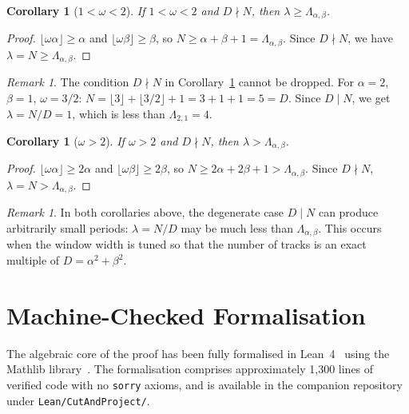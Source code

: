 \documentclass[11pt]{article}
\theoremstyle{plain}
\newtheorem{corollary}[theorem]{Corollary}
\theoremstyle{definition}
\theoremstyle{remark}
\newtheorem{remark}[theorem]{Remark}
\begin{document}
\begin{corollary}[$1 < \omega < 2$]\label{cor:medium_omega}
If $1 < \omega < 2$ and $D \nmid N$, then
$\lambda \ge \Lambda_{\alpha,\beta}$.
\end{corollary}
\begin{proof}
$\lfloor\omega\alpha\rfloor \ge \alpha$ and
$\lfloor\omega\beta\rfloor \ge \beta$, so
$N \ge \alpha + \beta + 1 = \Lambda_{\alpha,\beta}$.
Since $D \nmid N$, we have $\lambda = N \ge \Lambda_{\alpha,\beta}$.
\end{proof}

\begin{remark}
The condition $D \nmid N$ in Corollary~\ref{cor:medium_omega} cannot be
dropped.  For $\alpha = 2$, $\beta = 1$, $\omega = 3/2$:
$N = \lfloor 3 \rfloor + \lfloor 3/2 \rfloor + 1 = 3 + 1 + 1 = 5 = D$.
Since $D \mid N$, we get $\lambda = N/D = 1$, which is less than
$\Lambda_{2,1} = 4$.
\end{remark}

\begin{corollary}[$\omega > 2$]\label{cor:large_omega}
If $\omega > 2$ and $D \nmid N$, then
$\lambda > \Lambda_{\alpha,\beta}$.
\end{corollary}
\begin{proof}
$\lfloor\omega\alpha\rfloor \ge 2\alpha$ and
$\lfloor\omega\beta\rfloor \ge 2\beta$, so
$N \ge 2\alpha + 2\beta + 1 > \Lambda_{\alpha,\beta}$.
Since $D \nmid N$, $\lambda = N > \Lambda_{\alpha,\beta}$.
\end{proof}

\begin{remark}
In both corollaries above, the degenerate case $D \mid N$ can produce
arbitrarily small periods: $\lambda = N/D$ may be much less than
$\Lambda_{\alpha,\beta}$.
This occurs when the window width is tuned so that the number of tracks
is an exact multiple of $D = \alpha^2 + \beta^2$.
\end{remark}

\section{Machine-Checked Formalisation}\label{sec:lean}

The algebraic core of the proof has been fully formalised in
Lean~4~\cite{Moura2021} using the Mathlib library~\cite{Mathlib2020}.
The formalisation comprises approximately 1{,}300 lines of verified code
with no \texttt{sorry} axioms, and is available in the companion
repository~\cite{Kunert2025} under \texttt{Lean/CutAndProject/}.
\end{document}
